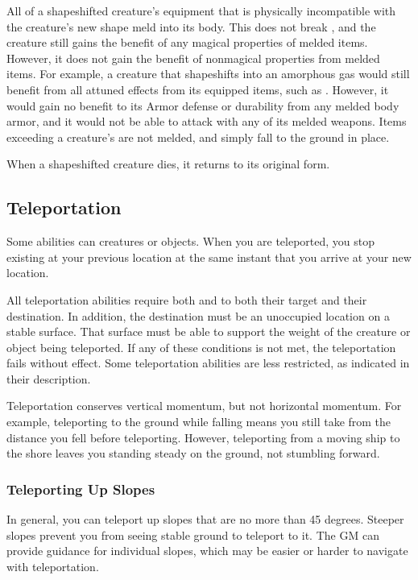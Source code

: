     All of a shapeshifted creature's equipment that is physically incompatible with the creature's new shape meld into its body.
    This does not break , and the creature still gains the benefit of any magical properties of melded items.
    However, it does not gain the benefit of nonmagical properties from melded items.
    For example, a creature that shapeshifts into an amorphous gas would still benefit from all attuned effects from its equipped items, such as .
    However, it would gain no benefit to its Armor defense or durability from any melded body armor, and it would not be able to attack with any of its melded weapons.
    Items exceeding a creature's  are not melded, and simply fall to the ground in place.

    When a shapeshifted creature dies, it returns to its original form.

  \subsection{Teleportation}\label{Teleportation}
    Some abilities can  creatures or objects.
    When you are teleported, you stop existing at your previous location at the same instant that you arrive at your new location.

    All teleportation abilities require both  and  to both their target and their destination.
    In addition, the destination must be an unoccupied location on a stable surface.
    That surface must be able to support the weight of the creature or object being teleported.
    If any of these conditions is not met, the teleportation fails without effect.
    Some teleportation abilities are less restricted, as indicated in their description.

    Teleportation conserves vertical momentum, but not horizontal momentum.
    For example, teleporting to the ground while falling means you still take  from the distance you fell before teleporting.
    However, teleporting from a moving ship to the shore leaves you standing steady on the ground, not stumbling forward.

    \subsubsection{Teleporting Up Slopes}
      In general, you can teleport up slopes that are no more than 45 degrees.
      Steeper slopes prevent you from seeing stable ground to teleport to it.
      The GM can provide guidance for individual slopes, which may be easier or harder to navigate with teleportation.

